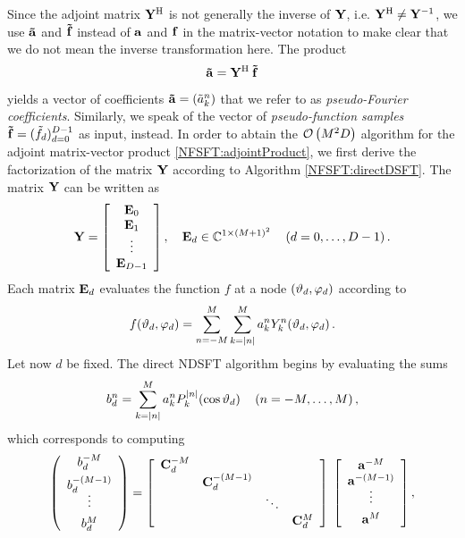 Since the adjoint matrix $\mathbf{Y}^{\text{\rm{H}}}$ is not generally the inverse of $\mathbf{Y}$, i.e. $\mathbf{Y}^{\text{\rm{H}}} 
\neq \mathbf{Y}^{-1}$, we use $\mathbf{\tilde{a}}$ and $\mathbf{\tilde{f}}$ instead of $\mathbf{a}$ and $\mathbf{f}$ 
in the matrix-vector notation to make clear 
that we do not mean the inverse transformation here. The product
\begin{equation}
  \label{NFSFT:adjointProduct}
  \mathbf{\tilde{a}} = \mathbf{Y}^{\text{\rm{H}}} \: \mathbf{\tilde{f}}
\end{equation}
yields a vector of coefficients $\mathbf{\tilde{a}} = \left(\tilde{a}_{k}^n\right)$ that 
we refer to as \emph{pseudo-Fourier coefficients}. Similarly, we speak of the vector of
\emph{pseudo-function samples} $\mathbf{\tilde{f}} = (\tilde{f}_{d})_{d=0}^{D-1}$ as input,
instead.
In order to abtain the $\mathcal{O}\left(M^2D\right)$ algorithm for the adjoint matrix-vector product 
\eqref{NFSFT:adjointProduct}, 
we first derive the factorization of the matrix $\mathbf{Y}$ according to Algorithm 
\ref{NFSFT:directDSFT}. The matrix $\mathbf{Y}$ can be written as
\[
  \mathbf{Y} = 
    \left[\begin{array}{c}
      \mathbf{E}_{0}\\
      \mathbf{E}_{1}\\
      \vdots\\
      \mathbf{E}_{D-1}
    \end{array}\right], \quad \mathbf{E}_{d} \in \mathbb{C}^{1 \times (M+1)^2} \quad \left(d=0,\ldots,D-1\right).
\]
Each matrix $\mathbf{E}_{d}$ evaluates the function $f$ at a node $\left(\vartheta_{d},\varphi_{d}\right)$ according to 
\[
  f{\hspace{-0.4ex}}\left(\vartheta_{d},\varphi_{d}\right) = \sum_{n=-M}^M \sum_{k=\left\vert n\right\vert}^M a_k^n Y_{k}^n{\hspace{-0.4ex}}\left(\vartheta_{d},\varphi_{d}\right).
\]
Let now $d$ be fixed. The direct NDSFT algorithm begins by evaluating the sums
\[
  b^{n}_{d} = \sum_{k=\left\vert n\right\vert}^M a_{k}^n P_{k}^{\left\vert n\right\vert}{\hspace{-0.4ex}}\left(\cos\vartheta_{d}\right) \quad \left(n=-M,\ldots,M\right), 
\]
which corresponds to computing
\[
  \left(\begin{array}{c}
    b^{-M}_{d}\\[1ex]
    b^{-(M-1)}_{d}\\[-1ex]
    \vdots\\[1ex]
    b^{M}_{d}
  \end{array}\right)
  =
  \left[\begin{array}{cccc}
    \mathbf{C}^{-M}_{d} &                    &        &               \\
                   & \mathbf{C}^{-(M-1)}_{d} &        &               \\
                   &                    & \ddots &               \\
                   &                    &        & \mathbf{C}^{M}_{d} 
  \end{array}\right]
  \:
  \left[\begin{array}{c}
    \mathbf{a}^{-M}\\
    \mathbf{a}^{-(M-1)}\\[-1ex]
    \vdots\\[1ex]
    \mathbf{a}^{M}
  \end{array}\right],
\]
